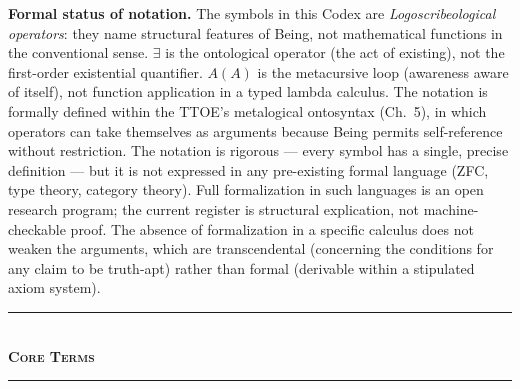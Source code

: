 \documentclass[10pt, openany, oneside]{book}
\renewcommand{\normalsize}{\fontsize{10}{13}\selectfont}
\renewcommand{\footnotesize}{\fontsize{8.5}{11}\selectfont}
\begin{document}
\vspace{0.5em}

{\footnotesize
\noindent\textbf{Formal status of notation.} The symbols in this Codex are \textit{Logoscribeological operators}: they name structural features of Being, not mathematical functions in the conventional sense. $\exists$ is the ontological operator (the act of existing), not the first-order existential quantifier. $A(A)$ is the metacursive loop (awareness aware of itself), not function application in a typed lambda calculus. The notation is formally defined within the TTOE's metalogical ontosyntax (Ch.\ 5), in which operators can take themselves as arguments because Being permits self-reference without restriction. The notation is rigorous --- every symbol has a single, precise definition --- but it is not expressed in any pre-existing formal language (ZFC, type theory, category theory). Full formalization in such languages is an open research program; the current register is structural explication, not machine-checkable proof. The absence of formalization in a specific calculus does not weaken the arguments, which are transcendental (concerning the conditions for any claim to be truth-apt) rather than formal (derivable within a stipulated axiom system).
}

\vspace{1.5em}

\newpage


\begin{center}
    \rule{0.3\textwidth}{0.4pt}\\[0.5em]
    {\normalsize\bfseries\scshape Core Terms}\\[0.3em]
    \rule{0.3\textwidth}{0.4pt}
\end{center}

\vspace{1em}
\end{document}
